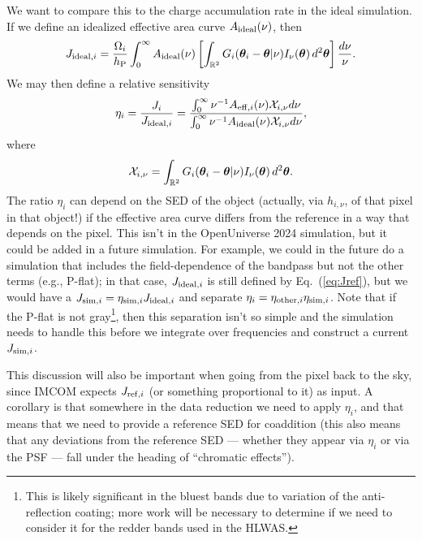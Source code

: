 \documentclass[prd,onecolumn,nofootinbib,nobibnotes]{revtex4}
\begin{document}
We want to compare this to the charge accumulation rate in the ideal simulation. If we define an idealized effective area curve $A_{\rm ideal}(\nu)$, then
\begin{equation}
J_{{\rm ideal},i} = \frac{\Omega_i}{h_{\rm P}} \int_0^\infty A_{{\rm ideal}}(\nu) \left[ \int_{{\mathbb R}^2} G_i({\boldsymbol\theta}_i-{\boldsymbol\theta}|\nu) I_\nu({\boldsymbol\theta})\, d^2{\boldsymbol\theta} \right] \frac{d\nu}\nu.
\label{eq:Jref}
\end{equation}
We may then define a relative sensitivity
\begin{equation}
\eta_i = \frac{J_i}{J_{{\rm ideal},i}} = \frac{
\int_0^\infty \nu^{-1} A_{{\rm eff},i}(\nu) {\cal X}_{i,\nu} d\nu
}{
\int_0^\infty \nu^{-1} A_{{\rm ideal}}(\nu) {\cal X}_{i,\nu} d\nu
},
\label{eq:eta-i}
\end{equation}
where
\begin{equation}
{\cal X}_{i,\nu} =  \int_{{\mathbb R}^2} G_i({\boldsymbol\theta}_i-{\boldsymbol\theta}|\nu) I_\nu({\boldsymbol\theta})\, d^2{\boldsymbol\theta}.
\end{equation}
The ratio $\eta_i$ can depend on the SED of the object (actually, via $h_{i,\nu}$, of that pixel in that object!) if the effective area curve differs from the reference in a way that depends on the pixel. This isn't in the OpenUniverse 2024 simulation, but it could be added in a future simulation. For example, we could in the future do a simulation that includes the field-dependence of the bandpass but not the other terms (e.g., P-flat); in that case, $J_{{\rm ideal},i}$ is still defined by Eq.~(\ref{eq:Jref}), but we would have a $J_{{\rm sim},i} = \eta_{{\rm sim},i}J_{{\rm ideal},i}$ and separate $\eta_i = \eta_{{\rm other},i} \eta_{{\rm sim},i}$. Note that if the P-flat is not gray\footnote{This is likely significant in the bluest bands due to variation of the anti-reflection coating; more work will be necessary to determine if we need to consider it for the redder bands used in the HLWAS.}, then this separation isn't so simple and the simulation needs to handle this before we integrate over frequencies and construct a current $J_{{\rm sim},i}$.

This discussion will also be important when going from the pixel back to the sky, since IMCOM expects $J_{{\rm ref},i}$ (or something proportional to it) as input. A corollary is that somewhere in the data reduction we need to apply $\eta_i$, and that means that we need to provide a reference SED for coaddition (this also means that any deviations from the reference SED --- whether they appear via $\eta_i$ or via the PSF --- fall under the heading of ``chromatic effects'').
\end{document}
